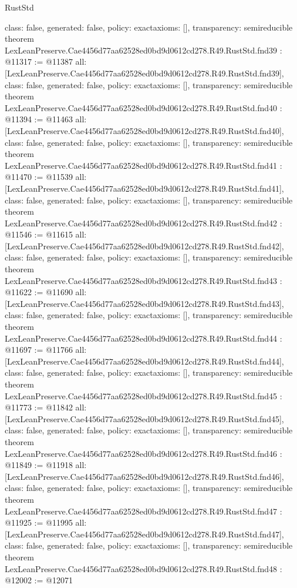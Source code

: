 \begin{lexlean}{RustStd}
\begin{coremodule}
{  class: false,
  generated: false,
  policy: exact{axioms: []},
  transparency: semireducible
}
theorem LexLeanPreserve.Cae4456d77aa62528ed0bd9d0612cd278.R49.RustStd.fnd39 : @11317 := @11387 {
  all: [LexLeanPreserve.Cae4456d77aa62528ed0bd9d0612cd278.R49.RustStd.fnd39],
  class: false,
  generated: false,
  policy: exact{axioms: []},
  transparency: semireducible
}
theorem LexLeanPreserve.Cae4456d77aa62528ed0bd9d0612cd278.R49.RustStd.fnd40 : @11394 := @11463 {
  all: [LexLeanPreserve.Cae4456d77aa62528ed0bd9d0612cd278.R49.RustStd.fnd40],
  class: false,
  generated: false,
  policy: exact{axioms: []},
  transparency: semireducible
}
theorem LexLeanPreserve.Cae4456d77aa62528ed0bd9d0612cd278.R49.RustStd.fnd41 : @11470 := @11539 {
  all: [LexLeanPreserve.Cae4456d77aa62528ed0bd9d0612cd278.R49.RustStd.fnd41],
  class: false,
  generated: false,
  policy: exact{axioms: []},
  transparency: semireducible
}
theorem LexLeanPreserve.Cae4456d77aa62528ed0bd9d0612cd278.R49.RustStd.fnd42 : @11546 := @11615 {
  all: [LexLeanPreserve.Cae4456d77aa62528ed0bd9d0612cd278.R49.RustStd.fnd42],
  class: false,
  generated: false,
  policy: exact{axioms: []},
  transparency: semireducible
}
theorem LexLeanPreserve.Cae4456d77aa62528ed0bd9d0612cd278.R49.RustStd.fnd43 : @11622 := @11690 {
  all: [LexLeanPreserve.Cae4456d77aa62528ed0bd9d0612cd278.R49.RustStd.fnd43],
  class: false,
  generated: false,
  policy: exact{axioms: []},
  transparency: semireducible
}
theorem LexLeanPreserve.Cae4456d77aa62528ed0bd9d0612cd278.R49.RustStd.fnd44 : @11697 := @11766 {
  all: [LexLeanPreserve.Cae4456d77aa62528ed0bd9d0612cd278.R49.RustStd.fnd44],
  class: false,
  generated: false,
  policy: exact{axioms: []},
  transparency: semireducible
}
theorem LexLeanPreserve.Cae4456d77aa62528ed0bd9d0612cd278.R49.RustStd.fnd45 : @11773 := @11842 {
  all: [LexLeanPreserve.Cae4456d77aa62528ed0bd9d0612cd278.R49.RustStd.fnd45],
  class: false,
  generated: false,
  policy: exact{axioms: []},
  transparency: semireducible
}
theorem LexLeanPreserve.Cae4456d77aa62528ed0bd9d0612cd278.R49.RustStd.fnd46 : @11849 := @11918 {
  all: [LexLeanPreserve.Cae4456d77aa62528ed0bd9d0612cd278.R49.RustStd.fnd46],
  class: false,
  generated: false,
  policy: exact{axioms: []},
  transparency: semireducible
}
theorem LexLeanPreserve.Cae4456d77aa62528ed0bd9d0612cd278.R49.RustStd.fnd47 : @11925 := @11995 {
  all: [LexLeanPreserve.Cae4456d77aa62528ed0bd9d0612cd278.R49.RustStd.fnd47],
  class: false,
  generated: false,
  policy: exact{axioms: []},
  transparency: semireducible
}
theorem LexLeanPreserve.Cae4456d77aa62528ed0bd9d0612cd278.R49.RustStd.fnd48 : @12002 := @12071 {
}
\end{coremodule}
\end{lexlean}
